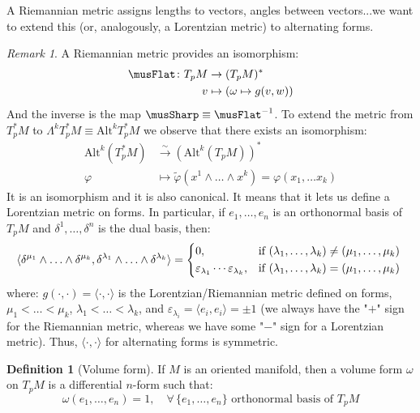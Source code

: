 \documentclass[a4paper,11pt,titlepage, article, oneside]{memoir}
\numberwithin{equation}{section}
\theoremstyle{definition}
\newtheorem{definition}[theorem]{Definition}
\theoremstyle{remark}
\newtheorem{remark}[theorem]{Remark}
\begin{document}
A Riemannian metric assigns lengths to vectors, angles between vectors...we want to extend this (or, analogously, a Lorentzian metric) to alternating forms.
\begin{remarkbox}\begin{remark} \label{genmetricrem}
A Riemannian metric provides an isomorphism:
\begin{align*}
\musFlat \colon T_p M &\rightarrow (T_p M)^* \\
v &\mapsto (\omega \mapsto g(v, w))
\end{align*}
And the inverse is the map $\musSharp \equiv \musFlat^{-1}$. To extend the metric from $T_p^* M$ to $\Lambda^kT_p^* M \equiv \text{Alt}^k T_p^* M$ we observe that there exists an isomorphism:
\begin{align*}
\text{Alt}^k(T_p^*M) & \overset{\sim}{\longrightarrow} (\text{Alt}^k(T_p M))^* \\
\varphi &\longmapsto \tilde{\varphi} (x^1 \wedge \ldots \wedge x^k) = \varphi(x_1, \ldots x_k)
\end{align*}
It is an isomorphism and it is also canonical. It means that it lets us define a Lorentzian metric on forms. In particular, if $e_1, \ldots, e_n$ is an orthonormal basis of $T_pM$ and $\delta^1, \ldots, \delta^n$ is the dual basis, then:
\begin{equation*}
\langle \delta^{\mu_1} \wedge \ldots \wedge \delta^{\mu_k}, \delta^{\lambda_1}\wedge \ldots \wedge \delta^{\lambda_k} \rangle = \begin{cases*}
0, & if $(\lambda_1, \ldots, \lambda_k) \not = (\mu_1, \ldots, \mu_k)$\\
\varepsilon_{\lambda_1}\cdots \varepsilon_{\lambda_k}, &if $(\lambda_1, \ldots, \lambda_k) = (\mu_1, \ldots, \mu_k)$ 
\end{cases*}
\end{equation*}
where: $g(\cdot, \cdot) = \langle\cdot, \cdot\rangle$ is the Lorentzian/Riemannian metric defined on forms, $\mu_1 < \ldots < \mu_k$, $\lambda_1 < \ldots < \lambda_k$, and $\varepsilon_{\lambda_i}= \langle e_i, e_i \rangle = \pm1$ (we always have the "$+$" sign for the Riemannian metric, whereas we have some "$-$" sign for a Lorentzian metric). Thus, $\langle \cdot, \cdot \rangle$ for alternating forms is symmetric.
\end{remark}\end{remarkbox}

\begin{definition}[Volume form]
If $M$ is an oriented manifold, then a volume form $\omega$ on $T_pM$ is a  differential $n$-form such that:
\begin{equation}
\omega(e_1, \ldots, e_n) = 1, \quad \forall\, \{e_1, \ldots, e_n\} \text{ orthonormal basis of }T_pM
\end{equation}
\end{definition}
\end{document}
